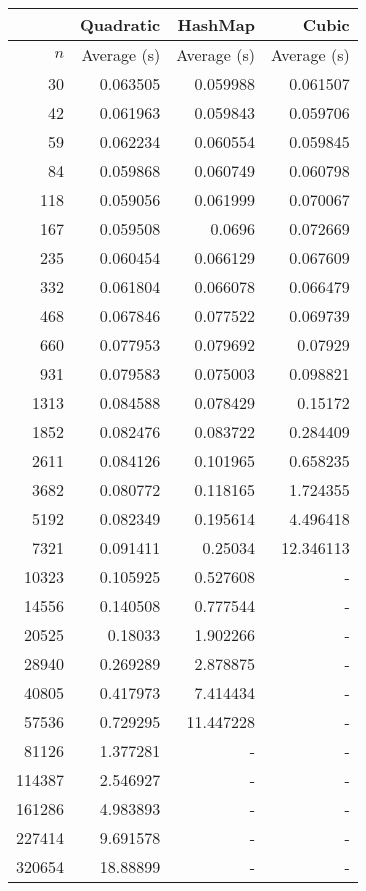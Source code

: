 \begin{tabular}{rrrr}
    &	Quadratic	&	HashMap	&	Cubic	\\\hline
    $n$	&	Average (s)	&	Average (s)	&	Average (s)	\\\hline
    30	&	0.063505	&	0.059988	&	0.061507	\\
    42	&	0.061963	&	0.059843	&	0.059706	\\
    59	&	0.062234	&	0.060554	&	0.059845	\\
    84	&	0.059868	&	0.060749	&	0.060798	\\
    118	&	0.059056	&	0.061999	&	0.070067	\\
    167	&	0.059508	&	0.0696	&	0.072669	\\
    235	&	0.060454	&	0.066129	&	0.067609	\\
    332	&	0.061804	&	0.066078	&	0.066479	\\
    468	&	0.067846	&	0.077522	&	0.069739	\\
    660	&	0.077953	&	0.079692	&	0.07929	\\
    931	&	0.079583	&	0.075003	&	0.098821	\\
    1313	&	0.084588	&	0.078429	&	0.15172	\\
    1852	&	0.082476	&	0.083722	&	0.284409	\\
    2611	&	0.084126	&	0.101965	&	0.658235	\\
    3682	&	0.080772	&	0.118165	&	1.724355	\\
    5192	&	0.082349	&	0.195614	&	4.496418	\\
    7321	&	0.091411	&	0.25034	&	12.346113	\\
    10323	&	0.105925	&	0.527608	&	-	\\
    14556	&	0.140508	&	0.777544	&	-	\\
    20525	&	0.18033	&	1.902266	&	-	\\
    28940	&	0.269289	&	2.878875	&	-	\\
    40805	&	0.417973	&	7.414434	&	-	\\
    57536	&	0.729295	&	11.447228	&	-	\\
    81126	&	1.377281	&	-	&	-	\\
    114387	&	2.546927	&	-	&	-	\\
    161286	&	4.983893	&	-	&	-	\\
    227414	&	9.691578	&	-	&	-	\\
    320654	&	18.88899	&	-	&	-	\\
\end{tabular}